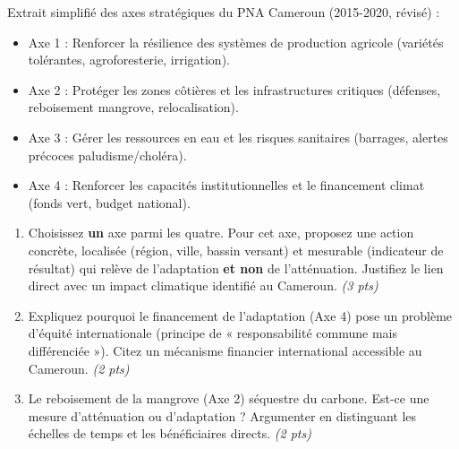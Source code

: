 \documentclass[11pt]{article}
\begin{document}
\begin{exercice}
Extrait simplifié des axes stratégiques du PNA Cameroun (2015-2020, révisé) :
\begin{itemize}
    \item Axe 1 : Renforcer la résilience des systèmes de production agricole (variétés tolérantes, agroforesterie, irrigation).
    \item Axe 2 : Protéger les zones côtières et les infrastructures critiques (défenses, reboisement mangrove, relocalisation).
    \item Axe 3 : Gérer les ressources en eau et les risques sanitaires (barrages, alertes précoces paludisme/choléra).
    \item Axe 4 : Renforcer les capacités institutionnelles et le financement climat (fonds vert, budget national).
\end{itemize}

\begin{enumerate}
    \item Choisissez \textbf{un} axe parmi les quatre. Pour cet axe, proposez une action concrète, localisée (région, ville, bassin versant) et mesurable (indicateur de résultat) qui relève de l'adaptation \textbf{et non} de l'atténuation. Justifiez le lien direct avec un impact climatique identifié au Cameroun. \textit{(3 pts)}
    \item Expliquez pourquoi le financement de l'adaptation (Axe 4) pose un problème d'équité internationale (principe de « responsabilité commune mais différenciée »). Citez un mécanisme financier international accessible au Cameroun. \textit{(2 pts)}
    \item Le reboisement de la mangrove (Axe 2) séquestre du carbone. Est-ce une mesure d'atténuation ou d'adaptation ? Argumenter en distinguant les échelles de temps et les bénéficiaires directs. \textit{(2 pts)}
\end{enumerate}
\end{exercice}
\end{document}
